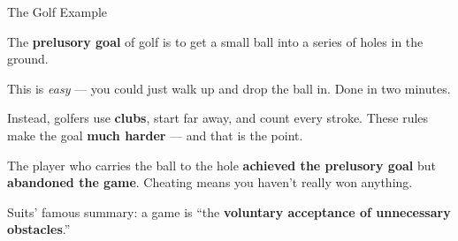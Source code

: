 \documentclass[aspectratio=169,11pt]{beamer}
\begin{document}
\begin{frame}[t]{The Golf Example}
\begin{casestudybox}
\footnotesize
The \textbf{prelusory goal} of golf is to get a small ball into a series of holes in the ground.

\vspace{0.1cm}
This is \emph{easy} --- you could just walk up and drop the ball in. Done in two minutes.

\vspace{0.1cm}
Instead, golfers use \textbf{clubs}, start far away, and count every stroke. These rules make the goal \textbf{much harder} --- and that is the point.

\vspace{0.1cm}
The player who carries the ball to the hole \textbf{achieved the prelusory goal} but \textbf{abandoned the game}. Cheating means you haven't really won anything.
\end{casestudybox}

\vspace{0.15cm}
Suits' famous summary: a game is ``the \textbf{voluntary acceptance of unnecessary obstacles}.''
\end{frame}
\end{document}
